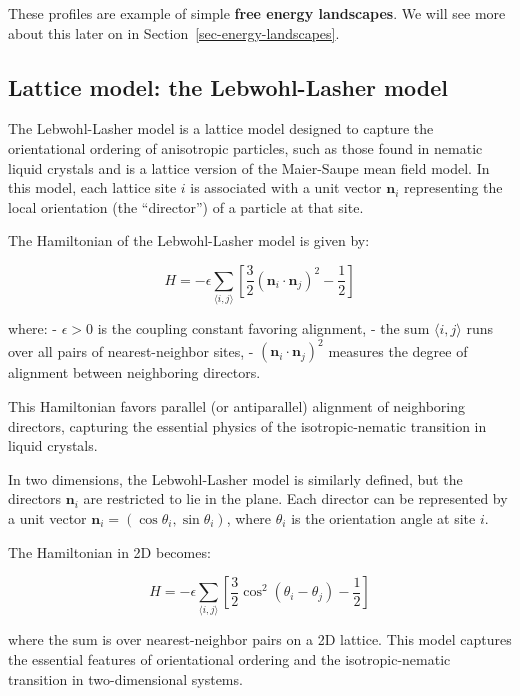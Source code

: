 \documentclass[
  letterpaper,
  enabledeprecatedfontcommands]{report}
\begin{document}
These profiles are example of simple \textbf{free energy landscapes}. We
will see more about this later on in
Section~\ref{sec-energy-landscapes}.

\subsection{Lattice model: the Lebwohl-Lasher
model}\label{lattice-model-the-lebwohl-lasher-model}

The Lebwohl-Lasher model is a lattice model designed to capture the
orientational ordering of anisotropic particles, such as those found in
nematic liquid crystals and is a lattice version of the Maier-Saupe mean
field model. In this model, each lattice site \(i\) is associated with a
unit vector \(\mathbf{n}_i\) representing the local orientation (the
``director'') of a particle at that site.

The Hamiltonian of the Lebwohl-Lasher model is given by:

\[
H = -\epsilon \sum_{\langle i, j \rangle} \left[ \frac{3}{2} (\mathbf{n}_i \cdot \mathbf{n}_j)^2 - \frac{1}{2} \right]
\]

where: - \(\epsilon > 0\) is the coupling constant favoring alignment, -
the sum \(\langle i, j \rangle\) runs over all pairs of nearest-neighbor
sites, - \((\mathbf{n}_i \cdot \mathbf{n}_j)^2\) measures the degree of
alignment between neighboring directors.

This Hamiltonian favors parallel (or antiparallel) alignment of
neighboring directors, capturing the essential physics of the
isotropic-nematic transition in liquid crystals.

In two dimensions, the Lebwohl-Lasher model is similarly defined, but
the directors \(\mathbf{n}_i\) are restricted to lie in the plane. Each
director can be represented by a unit vector
\(\mathbf{n}_i = (\cos\theta_i, \sin\theta_i)\), where \(\theta_i\) is
the orientation angle at site \(i\).

The Hamiltonian in 2D becomes:

\[
H = -\epsilon \sum_{\langle i, j \rangle} \left[ \frac{3}{2} \cos^2(\theta_i - \theta_j) - \frac{1}{2} \right]
\]

where the sum is over nearest-neighbor pairs on a 2D lattice. This model
captures the essential features of orientational ordering and the
isotropic-nematic transition in two-dimensional systems.
\end{document}
